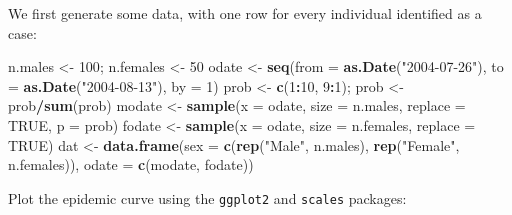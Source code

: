\documentclass[
]{article}
\newenvironment{Shaded}{\begin{snugshade}}{\end{snugshade}}
\newcommand{\DataTypeTok}[1]{\textcolor[rgb]{0.13,0.29,0.53}{#1}}
\newcommand{\DecValTok}[1]{\textcolor[rgb]{0.00,0.00,0.81}{#1}}
\newcommand{\KeywordTok}[1]{\textcolor[rgb]{0.13,0.29,0.53}{\textbf{#1}}}
\newcommand{\NormalTok}[1]{#1}
\newcommand{\OperatorTok}[1]{\textcolor[rgb]{0.81,0.36,0.00}{\textbf{#1}}}
\newcommand{\OtherTok}[1]{\textcolor[rgb]{0.56,0.35,0.01}{#1}}
\newcommand{\StringTok}[1]{\textcolor[rgb]{0.31,0.60,0.02}{#1}}
\begin{document}
We first generate some data, with one row for every individual
identified as a case:

\begin{Shaded}
\begin{Highlighting}[]
\NormalTok{n.males \textless{}{-}}\StringTok{ }\DecValTok{100}\NormalTok{; n.females \textless{}{-}}\StringTok{ }\DecValTok{50}
\NormalTok{odate \textless{}{-}}\StringTok{ }\KeywordTok{seq}\NormalTok{(}\DataTypeTok{from =} \KeywordTok{as.Date}\NormalTok{(}\StringTok{"2004{-}07{-}26"}\NormalTok{), }\DataTypeTok{to =} \KeywordTok{as.Date}\NormalTok{(}\StringTok{"2004{-}08{-}13"}\NormalTok{), }\DataTypeTok{by =} \DecValTok{1}\NormalTok{)}
\NormalTok{prob \textless{}{-}}\StringTok{ }\KeywordTok{c}\NormalTok{(}\DecValTok{1}\OperatorTok{:}\DecValTok{10}\NormalTok{, }\DecValTok{9}\OperatorTok{:}\DecValTok{1}\NormalTok{); prob \textless{}{-}}\StringTok{ }\NormalTok{prob}\OperatorTok{/}\KeywordTok{sum}\NormalTok{(prob)}
\NormalTok{modate \textless{}{-}}\StringTok{ }\KeywordTok{sample}\NormalTok{(}\DataTypeTok{x =}\NormalTok{ odate, }\DataTypeTok{size =}\NormalTok{ n.males, }\DataTypeTok{replace =} \OtherTok{TRUE}\NormalTok{, }\DataTypeTok{p =}\NormalTok{ prob)}
\NormalTok{fodate \textless{}{-}}\StringTok{ }\KeywordTok{sample}\NormalTok{(}\DataTypeTok{x =}\NormalTok{ odate, }\DataTypeTok{size =}\NormalTok{ n.females, }\DataTypeTok{replace =} \OtherTok{TRUE}\NormalTok{)}
\NormalTok{dat \textless{}{-}}\StringTok{ }\KeywordTok{data.frame}\NormalTok{(}\DataTypeTok{sex =} \KeywordTok{c}\NormalTok{(}\KeywordTok{rep}\NormalTok{(}\StringTok{"Male"}\NormalTok{, n.males), }\KeywordTok{rep}\NormalTok{(}\StringTok{"Female"}\NormalTok{, n.females)), }
   \DataTypeTok{odate =} \KeywordTok{c}\NormalTok{(modate, fodate))}
\end{Highlighting}
\end{Shaded}

Plot the epidemic curve using the \texttt{ggplot2} and \texttt{scales}
packages:
\end{document}
